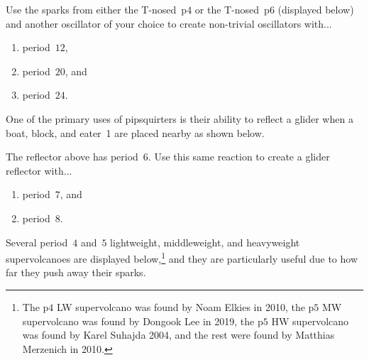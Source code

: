 \begin{multicols}{2}
	
	\mfilbreak
	
	
	\begin{problemstar}\label{exer:t_sparkers} 
		Use the sparks from either the T-nosed~p$4$ or the T-nosed~p$6$ (displayed below) and another oscillator of your choice to create non-trivial oscillators with...
		
		\begin{center}
		\end{center}
		
		\begin{enumerate}[label=\bf\color{ocre}(\alph*)]
			\item period~$12$,
			
			\item period~$20$, and
			
			\item period~$24$.
		\end{enumerate}
	\end{problemstar}
	
	
	\mfilbreak
	
	
	\begin{problem}\label{exer:pipsquirter_reflectors}
		One of the primary uses of pipsquirters is their ability to reflect a glider when a boat, block, and eater~1 are placed nearby as shown below.
		
		\begin{center}
		\end{center}
		
		\noindent The reflector above has period~$6$. Use this same reaction to create a glider reflector with...\smallskip
		
		\begin{enumerate}[label=\bf\color{ocre}(\alph*)]
			\item {} period~$7$, and
			
			\item {} period~$8$.
		\end{enumerate}
	\end{problem}
	
	
	\mfilbreak
	
	
	\begin{problem}\label{exer:volcanoes}
		Several period~$4$ and~$5$ lightweight, middleweight, and heavyweight supervolcanoes are displayed below,\footnote{The p$4$ LW supervolcano was found by Noam Elkies in 2010, the p$5$ MW supervolcano was found by Dongook Lee in 2019, the p$5$ HW supervolcano was found by Karel Suhajda 2004, and the rest were found by Matthias Merzenich in 2010.} and they are particularly useful due to how far they push away their sparks.
		

\end{problem}
\end{multicols}
